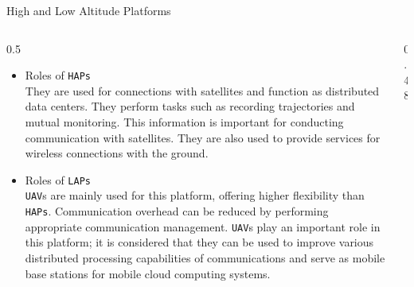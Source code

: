 \documentclass[11pt, aspectratio=169]{beamer}
\begin{document}
\begin{frame}[c]{High and Low Altitude Platforms}
  \begin{columns}[c]
    \begin{column}{0.5\textwidth}
      \scriptsize
      \begin{itemize}
        \item Roles of \texttt{HAPs} \\
        They are used for connections with satellites and function as distributed data centers. They perform tasks such as recording trajectories and mutual monitoring. This information is important for conducting communication with satellites. They are also used to provide services for wireless connections with the ground.

        \vspace{0.5em}
        \item Roles of \texttt{LAPs} \\
        \texttt{UAV}s are mainly used for this platform, offering higher flexibility than \texttt{HAPs}. Communication overhead can be reduced by performing appropriate communication management. \texttt{UAV}s play an important role in this platform; it is considered that they can be used to improve various distributed processing capabilities of communications and serve as mobile base stations for mobile cloud computing systems.
      \end{itemize}
    \end{column}

    \begin{column}{0.48\textwidth}
      \begin{center}
\end{center}
\end{column}
\end{columns}
\end{frame}
\end{document}
